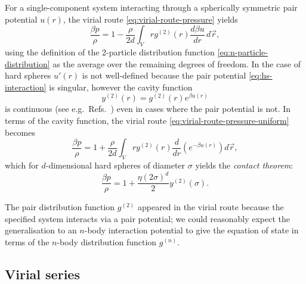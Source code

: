 \begin{tcolorbox}[title=Contact theorem for hard spheres]
  For a single-component system interacting through a spherically symmetric pair potential $u(r)$, the virial route \eqref{eq:virial-route-pressure} yields
  \begin{equation}\label{eq:virial-route-pressure-uniform}
    \frac{\beta p}{\rho}
    =
    1
    -
    \frac{\rho}{2 d}
    \int_V
    r g^{(2)}(r) \frac{d \beta u}{d r} \, d\vec{r},
  \end{equation}
  using the definition of the 2-particle distribution function \eqref{eq:n-particle-distribution} as the average over the remaining degrees of freedom.
  In the case of hard spheres $u'(r)$ is not well-defined because the pair potential \eqref{eq:hs-interaction} is singular, however the cavity function
  \begin{equation*}\label{eq:cavity-function}
    y^{(2)}(r) = g^{(2)}(r) e^{\beta u(r)}
  \end{equation*}
  is continuous (see e.g.\ Refs.\ \cite{Hansen2013,Santos2016}) even in cases where the pair potential is not.
  In terms of the cavity function, the virial route \eqref{eq:virial-route-pressure-uniform} becomes
  \begin{equation*}\label{eq:virial-route-pressure-cavity}
    \frac{\beta p}{\rho}
    =
    1
    +
    \frac{\rho}{2 d}
    \int_V
    r y^{(2)}(r) \frac{d}{dr} \left( e^{-\beta u(r)} \right)
    d\vec{r},
  \end{equation*}
  which for $d$-dimensional hard spheres of diameter $\sigma$ yields the \emph{contact theorem}:
  \begin{equation}\label{eq:contact-theorem}
    \frac{\beta p}{\rho}
    =
    1
    +
    \frac{\eta (2\sigma)^d}{2}
    y^{(2)}(\sigma).
  \end{equation}
\end{tcolorbox}

The pair distribution function $g^{(2)}$ appeared in the virial route because the specified system interacts via a pair potential; we could reasonably expect the generalisation to an $n$-body interaction potential to give the equation of state in terms of the $n$-body distribution function $g^{(n)}$.

\subsection{Virial series}
\label{sec:virial-series}


